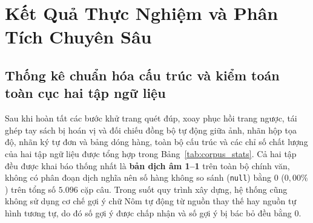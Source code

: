 \section{Kết Quả Thực Nghiệm và Phân Tích Chuyên Sâu}

\subsection{Thống kê chuẩn hóa cấu trúc và kiểm toán toàn cục hai tập ngữ liệu}

Sau khi hoàn tất các bước khử trang quét đúp, xoay phục hồi trang ngược, tái ghép tay sách bị hoán vị và đối chiếu đồng bộ tự động giữa ảnh, nhãn hộp tọa độ, nhãn ký tự đơn và bảng dóng hàng, toàn bộ cấu trúc và các chỉ số chất lượng của hai tập ngữ liệu được tổng hợp trong Bảng~\ref{tab:corpus_stats}. Cả hai tập đều được khai báo thống nhất là \textbf{bản dịch âm 1--1} trên toàn bộ chính văn, không có phân đoạn dịch nghĩa nên số hàng không so sánh (\texttt{null}) bằng $0$ ($0{,}00\%$) trên tổng số $5.096$ cặp câu. Trong suốt quy trình xây dựng, hệ thống cũng không sử dụng cơ chế gợi ý chữ Nôm tự động từ nguồn thay thế hay nguồn tự hình tương tự, do đó số gợi ý được chấp nhận và số gợi ý bị bác bỏ đều bằng $0$.

